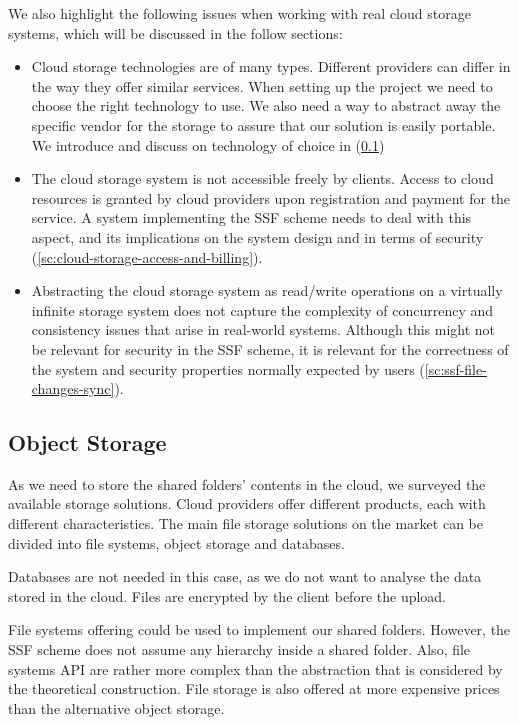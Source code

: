 We also highlight the following issues when working with
real cloud storage systems, which will be discussed in the
follow sections:
\begin{itemize}
    \item Cloud storage technologies are of many types.
    Different providers can differ in the way they
    offer similar services.
    When setting up the project we need to choose the right
    technology to use. We also need a way to
    abstract away the specific vendor for the storage
    to assure that our solution is easily portable.
    We introduce and discuss on technology of choice in (\cref{ssc:object-storage})
    \item The cloud storage system is not accessible freely
    by clients. Access to cloud resources is
    granted by cloud providers upon registration and payment
    for the service. A system implementing the SSF scheme
    needs to deal with this aspect, and its implications
    on the system design and in terms of security (\cref{sc:cloud-storage-access-and-billing}).
    \item Abstracting the cloud storage system as read/write
    operations on a virtually infinite storage system does
    not capture the complexity of concurrency and consistency
    issues that arise in real-world systems. Although this
    might not be relevant for security in the SSF scheme,
    it is relevant for the correctness of the system and
    security properties normally expected by users (\cref{sc:ssf-file-changes-sync}).
\end{itemize}

\subsection{Object Storage}\label{ssc:object-storage}
As we need to store the shared folders' contents in the cloud,
we surveyed the available storage solutions.
Cloud providers offer different products,
each with different characteristics. The main file
storage solutions on the market can be divided into
file systems, object storage and databases.

Databases are not needed in this case,
as we do not want to analyse the data stored in
the cloud. Files are encrypted by the client
before the upload.

File systems offering could be used to implement
our shared folders. However, the SSF scheme does not
assume any hierarchy inside a shared folder.
Also, file systems API are rather more complex
than the abstraction that is considered by the
theoretical construction. File storage is also offered
at more expensive prices than the alternative object storage.

